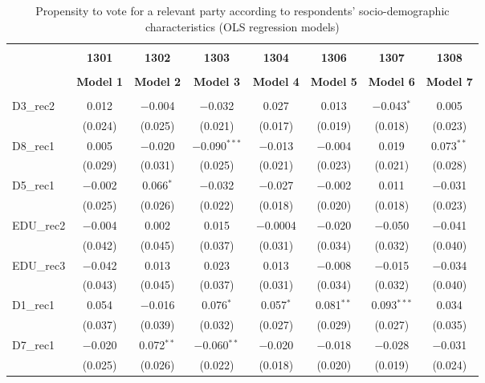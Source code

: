 \documentclass[
]{article}
\begin{document}
\begin{table}[!htbp] \centering 
  \caption{Propensity to vote for a relevant party according to respondents' 
                     socio-demographic characteristics (OLS regression models)} 
  \label{table:full_ols_hu} 
\begin{tabular}{@{\extracolsep{5pt}}lccccccc} 
\\[-1.8ex]\hline \\[-1.8ex] 
 & \textbf{1301} & \textbf{1302} & \textbf{1303} & \textbf{1304} & \textbf{1306} & \textbf{1307} & \textbf{1308} \\ 
\\[-1.8ex] & \textbf{Model 1} & \textbf{Model 2} & \textbf{Model 3} & \textbf{Model 4} & \textbf{Model 5} & \textbf{Model 6} & \textbf{Model 7}\\ 
\hline \\[-1.8ex] 
 D3\_rec2 & 0.012 & $-$0.004 & $-$0.032 & 0.027 & 0.013 & $-$0.043$^{*}$ & 0.005 \\ 
  & (0.024) & (0.025) & (0.021) & (0.017) & (0.019) & (0.018) & (0.023) \\ 
  D8\_rec1 & 0.005 & $-$0.020 & $-$0.090$^{***}$ & $-$0.013 & $-$0.004 & 0.019 & 0.073$^{**}$ \\ 
  & (0.029) & (0.031) & (0.025) & (0.021) & (0.023) & (0.021) & (0.028) \\ 
  D5\_rec1 & $-$0.002 & 0.066$^{*}$ & $-$0.032 & $-$0.027 & $-$0.002 & 0.011 & $-$0.031 \\ 
  & (0.025) & (0.026) & (0.022) & (0.018) & (0.020) & (0.018) & (0.023) \\ 
  EDU\_rec2 & $-$0.004 & 0.002 & 0.015 & $-$0.0004 & $-$0.020 & $-$0.050 & $-$0.041 \\ 
  & (0.042) & (0.045) & (0.037) & (0.031) & (0.034) & (0.032) & (0.040) \\ 
  EDU\_rec3 & $-$0.042 & 0.013 & 0.023 & 0.013 & $-$0.008 & $-$0.015 & $-$0.034 \\ 
  & (0.043) & (0.045) & (0.037) & (0.031) & (0.034) & (0.032) & (0.040) \\ 
  D1\_rec1 & 0.054 & $-$0.016 & 0.076$^{*}$ & 0.057$^{*}$ & 0.081$^{**}$ & 0.093$^{***}$ & 0.034 \\ 
  & (0.037) & (0.039) & (0.032) & (0.027) & (0.029) & (0.027) & (0.035) \\ 
  D7\_rec1 & $-$0.020 & 0.072$^{**}$ & $-$0.060$^{**}$ & $-$0.020 & $-$0.018 & $-$0.028 & $-$0.031 \\ 
  & (0.025) & (0.026) & (0.022) & (0.018) & (0.020) & (0.019) & (0.024) \\ 

\end{tabular}
\end{table}
\end{document}
